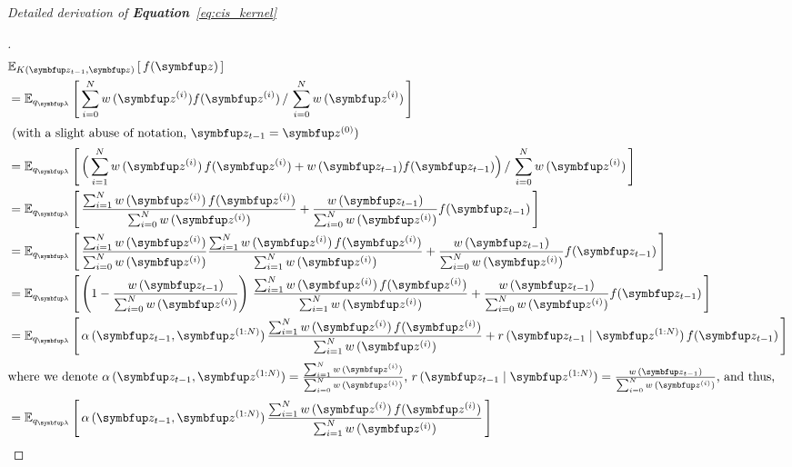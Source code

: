 

\textit{Detailed derivation of \textbf{Equation}~\eqref{eq:cis_kernel}}
\begin{proof}[\unskip\nopunct]
\begin{align}
  &\Esub{K(\vz_{t-1}, \vz)}{f(\vz)} \\
  &= \Esub{q_{\vlambda}}{
      \sum^{N}_{i=0} w\,(\vz^{(i)}) f(\vz^{(i)}) 
      \,/\,
      \sum^{N}_{i=0} w\,(\vz^{(i)})
  } \\
  \intertext{
    (with a slight abuse of notation, \(\vz_{t-1} = \vz^{(0)}\))
  }
  &= \Esub{q_{\vlambda}}{
    \Big(
    \sum^{N}_{i=1} w\,(\vz^{(i)})\,f(\vz^{(i)}) + w\,(\vz_{t-1}) f(\vz_{t-1})
    \Big)
      \,/\,
      \sum^{N}_{i=0} w\,(\vz^{(i)})
  } \\
  &= \Esub{q_{\vlambda}}{
    \frac{
      \sum^{N}_{i=1} w\,(\vz^{(i)})\,f(\vz^{(i)})
    }
    {
      \sum^{N}_{i=0} w\,(\vz^{(i)})
    }
    +
    \frac{w\,(\vz_{t-1})}{\sum^{N}_{i=0} w\,(\vz^{(i)})} f(\vz_{t-1})
  } \\
  &= \Esub{q_{\vlambda}}{
    \frac{
      \sum^{N}_{i=1} w\,(\vz^{(i)})  
    }
    {
      \sum^{N}_{i=0} w\,(\vz^{(i)})  
    }
    \frac{
      \sum^{N}_{i=1} w\,(\vz^{(i)})\,f(\vz^{(i)})
    }
    {
      \sum^{N}_{i=1} w\,(\vz^{(i)})
    }
    +
    \frac{w\,(\vz_{t-1})}{\sum^{N}_{i=0} w\,(\vz^{(i)})} f(\vz_{t-1})
  } \\
  &= \Esub{q_{\vlambda}}{
    \left(
    1 - \frac{
       w\,(\vz_{t-1}) 
    }
    {
      \sum^{N}_{i=0} w\,(\vz^{(i)})  
    }
    \right)\,
    \frac{
      \sum^{N}_{i=1} w\,(\vz^{(i)})\,f(\vz^{(i)})
    }
    {
      \sum^{N}_{i=1} w\,(\vz^{(i)})
    }
    +
    \frac{w\,(\vz_{t-1})}{\sum^{N}_{i=0} w\,(\vz^{(i)})} f(\vz_{t-1})
  } \\
  &= \Esub{q_{\vlambda}}{
    \alpha\,(\vz_{t-1}, \vz^{(1:N)}) \,
    \frac{
      \sum^{N}_{i=1} w\,(\vz^{(i)})\,f(\vz^{(i)})
    }
    {
      \sum^{N}_{i=1} w\,(\vz^{(i)})
    }
    +
    r\,(\vz_{t-1}\mid\vz^{(1:N)}) \, f(\vz_{t-1})
  }\label{eq:cis_kernel_inter} \\ 
  \intertext{where we denote
    \(
    \alpha\,(\vz_{t-1}, \vz^{(1:N)}) =
    \frac{
      \sum^{N}_{i=1} w\,(\vz^{(i)})  
    }
    {
      \sum^{N}_{i=0} w\,(\vz^{(i)})  
    }
  \),
  \(
  r\,(\vz_{t-1}\mid\vz^{(1:N)}) = \frac{w\,(\vz_{t-1})}{\sum^{N}_{i=0} w\,(\vz^{(i)})}
  \), and thus,
  }
%
  &= \Esub{q_{\vlambda}}{
    \alpha\,(\vz_{t-1}, \vz^{(1:N)}) \,
    \frac{
      \sum^{N}_{i=1} w\,(\vz^{(i)})\,f(\vz^{(i)})
    }
    {
      \sum^{N}_{i=1} w\,(\vz^{(i)})
    }
}
\end{align}
\end{proof}
